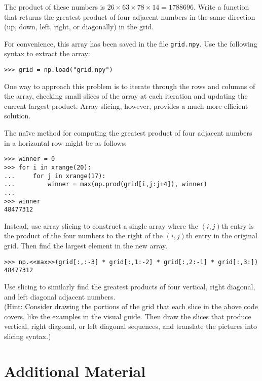\begin{problem}
The product of these numbers is $26 \times 63 \times 78 \times 14 = 1788696$.
Write a function that returns the greatest product of four adjacent numbers in the same direction (up, down, left, right, or diagonally) in the grid.

For convenience, this array has been saved in the file \texttt{grid.npy}.
Use the following syntax to extract the array:

\begin{lstlisting}
>>> grid = np.load("grid.npy")
\end{lstlisting}

One way to approach this problem is to iterate through the rows and columns of the array, checking small slices of the array at each iteration and updating the current largest product.
Array slicing, however, provides a much more efficient solution.

The na\"{i}ve method for computing the greatest product of four adjacent numbers in a horizontal row might be as follows:

\begin{lstlisting}
>>> winner = 0
>>> for i in xrange(20):
...     for j in xrange(17):
...         winner = max(np.prod(grid[i,j:j+4]), winner)
...
>>> winner
48477312
\end{lstlisting}

Instead, use array slicing to construct a single array where the $(i,j)$th entry is the product of the four numbers to the right of the $(i,j)$th entry in the original grid.
Then find the largest element in the new array.

\begin{lstlisting}
>>> np.<<max>>(grid[:,:-3] * grid[:,1:-2] * grid[:,2:-1] * grid[:,3:])
48477312
\end{lstlisting}

Use slicing to similarly find the greatest products of four vertical, right diagonal, and left diagonal adjacent numbers.
\\
(Hint: Consider drawing the portions of the grid that each slice in the above code covers, like the examples in the visual guide.
Then draw the slices that produce vertical, right diagonal, or left diagonal sequences, and translate the pictures into slicing syntax.)
\end{problem}

\newpage

\section*{Additional Material} %

